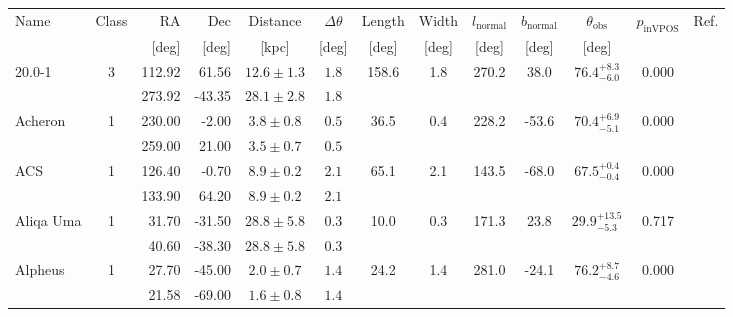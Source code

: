 \begin{tabular}{lcrrccccccccr}
	\toprule
	Name & Class & RA & Dec & Distance & $\Delta \theta$ & Length & Width & $l_\text{normal}$ & $b_\text{normal}$ & $\theta_\text{obs}$ & $p_\text{inVPOS}$ & Ref. \\
	 &  & [deg] & [deg] & [kpc] & [deg] & [deg] & [deg] & [deg] & [deg] & [deg] &  &  \\
	\midrule
	\multirow{2}{*}{20.0-1} & \multirow{2}{*}{3} & 112.92 & 61.56 & $12.6 \pm 1.3$ & $1.8$ & \multirow{2}{*}{158.6} & \multirow{2}{*}{1.8} & \multirow{2}{*}{270.2} & \multirow{2}{*}{38.0} & \multirow{2}{*}{$76.4^{+8.3}_{-6.0}$} & \multirow{2}{*}{0.000} & \multirow{2}{*}{\citet{Mateu:2018}} \\
	 &  & 273.92 & -43.35 & $28.1 \pm 2.8$ & $1.8$ &  &  &  &  &  &  &  \\
	\multirow{2}{*}{Acheron} & \multirow{2}{*}{1} & 230.00 & -2.00 & $3.8 \pm 0.8$ & $0.5$ & \multirow{2}{*}{36.5} & \multirow{2}{*}{0.4} & \multirow{2}{*}{228.2} & \multirow{2}{*}{-53.6} & \multirow{2}{*}{$70.4^{+6.9}_{-5.1}$} & \multirow{2}{*}{0.000} & \multirow{2}{*}{\citet{Grillmair:2009}} \\
	 &  & 259.00 & 21.00 & $3.5 \pm 0.7$ & $0.5$ &  &  &  &  &  &  &  \\
	\multirow{2}{*}{ACS} & \multirow{2}{*}{1} & 126.40 & -0.70 & $8.9 \pm 0.2$ & $2.1$ & \multirow{2}{*}{65.1} & \multirow{2}{*}{2.1} & \multirow{2}{*}{143.5} & \multirow{2}{*}{-68.0} & \multirow{2}{*}{$67.5^{+0.4}_{-0.4}$} & \multirow{2}{*}{0.000} & \multirow{2}{*}{\citet{Grillmair:2006a}} \\
	 &  & 133.90 & 64.20 & $8.9 \pm 0.2$ & $2.1$ &  &  &  &  &  &  &  \\
	\multirow{2}{*}{Aliqa Uma} & \multirow{2}{*}{1} & 31.70 & -31.50 & $28.8 \pm 5.8$ & $0.3$ & \multirow{2}{*}{10.0} & \multirow{2}{*}{0.3} & \multirow{2}{*}{171.3} & \multirow{2}{*}{23.8} & \multirow{2}{*}{$29.9^{+13.5}_{-5.3}$} & \multirow{2}{*}{0.717} & \multirow{2}{*}{\citet{Shipp:2018}} \\
	 &  & 40.60 & -38.30 & $28.8 \pm 5.8$ & $0.3$ &  &  &  &  &  &  &  \\
	\multirow{2}{*}{Alpheus} & \multirow{2}{*}{1} & 27.70 & -45.00 & $2.0 \pm 0.7$ & $1.4$ & \multirow{2}{*}{24.2} & \multirow{2}{*}{1.4} & \multirow{2}{*}{281.0} & \multirow{2}{*}{-24.1} & \multirow{2}{*}{$76.2^{+8.7}_{-4.6}$} & \multirow{2}{*}{0.000} & \multirow{2}{*}{\citet{Grillmair:2013}} \\
	 &  & 21.58 & -69.00 & $1.6 \pm 0.8$ & $1.4$ &  &  &  &  &  &  &  \\

\end{tabular}
